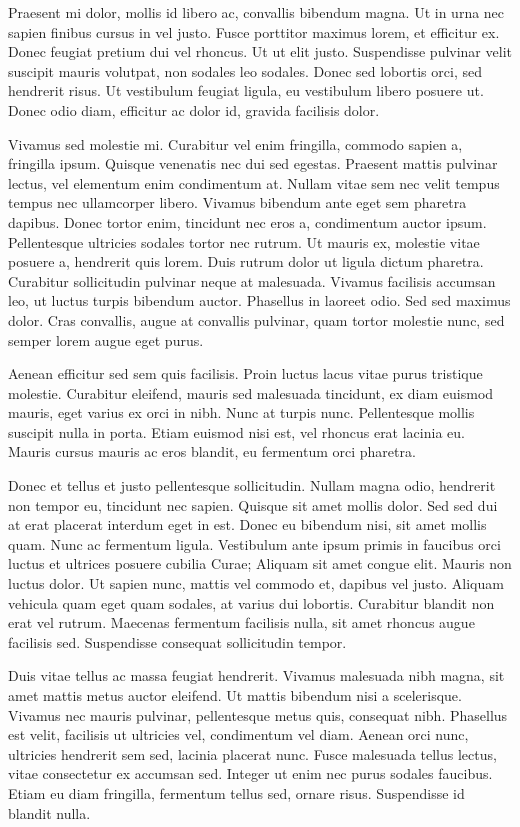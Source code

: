 Praesent mi dolor, mollis id libero ac, convallis bibendum magna. Ut in urna nec sapien finibus cursus in vel justo. Fusce porttitor maximus lorem, et efficitur ex. Donec feugiat pretium dui vel rhoncus. Ut ut elit justo. Suspendisse pulvinar velit suscipit mauris volutpat, non sodales leo sodales. Donec sed lobortis orci, sed hendrerit risus. Ut vestibulum feugiat ligula, eu vestibulum libero posuere ut. Donec odio diam, efficitur ac dolor id, gravida facilisis dolor.

Vivamus sed molestie mi. Curabitur vel enim fringilla, commodo sapien a, fringilla ipsum. Quisque venenatis nec dui sed egestas. Praesent mattis pulvinar lectus, vel elementum enim condimentum at. Nullam vitae sem nec velit tempus tempus nec ullamcorper libero. Vivamus bibendum ante eget sem pharetra dapibus. Donec tortor enim, tincidunt nec eros a, condimentum auctor ipsum. Pellentesque ultricies sodales tortor nec rutrum. Ut mauris ex, molestie vitae posuere a, hendrerit quis lorem. Duis rutrum dolor ut ligula dictum pharetra. Curabitur sollicitudin pulvinar neque at malesuada. Vivamus facilisis accumsan leo, ut luctus turpis bibendum auctor. Phasellus in laoreet odio. Sed sed maximus dolor. Cras convallis, augue at convallis pulvinar, quam tortor molestie nunc, sed semper lorem augue eget purus.

Aenean efficitur sed sem quis facilisis. Proin luctus lacus vitae purus tristique molestie. Curabitur eleifend, mauris sed malesuada tincidunt, ex diam euismod mauris, eget varius ex orci in nibh. Nunc at turpis nunc. Pellentesque mollis suscipit nulla in porta. Etiam euismod nisi est, vel rhoncus erat lacinia eu. Mauris cursus mauris ac eros blandit, eu fermentum orci pharetra.

Donec et tellus et justo pellentesque sollicitudin. Nullam magna odio, hendrerit non tempor eu, tincidunt nec sapien. Quisque sit amet mollis dolor. Sed sed dui at erat placerat interdum eget in est. Donec eu bibendum nisi, sit amet mollis quam. Nunc ac fermentum ligula. Vestibulum ante ipsum primis in faucibus orci luctus et ultrices posuere cubilia Curae; Aliquam sit amet congue elit. Mauris non luctus dolor. Ut sapien nunc, mattis vel commodo et, dapibus vel justo. Aliquam vehicula quam eget quam sodales, at varius dui lobortis. Curabitur blandit non erat vel rutrum. Maecenas fermentum facilisis nulla, sit amet rhoncus augue facilisis sed. Suspendisse consequat sollicitudin tempor.

Duis vitae tellus ac massa feugiat hendrerit. Vivamus malesuada nibh magna, sit amet mattis metus auctor eleifend. Ut mattis bibendum nisi a scelerisque. Vivamus nec mauris pulvinar, pellentesque metus quis, consequat nibh. Phasellus est velit, facilisis ut ultricies vel, condimentum vel diam. Aenean orci nunc, ultricies hendrerit sem sed, lacinia placerat nunc. Fusce malesuada tellus lectus, vitae consectetur ex accumsan sed. Integer ut enim nec purus sodales faucibus. Etiam eu diam fringilla, fermentum tellus sed, ornare risus. Suspendisse id blandit nulla.

